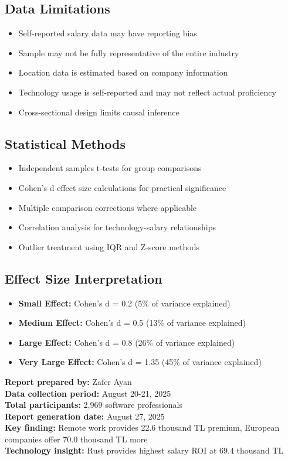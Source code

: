 \documentclass[12pt,a4paper]{article}
\begin{document}
\subsection{Data Limitations}
\begin{itemize}
    \item Self-reported salary data may have reporting bias
    \item Sample may not be fully representative of the entire industry
    \item Location data is estimated based on company information
    \item Technology usage is self-reported and may not reflect actual proficiency
    \item Cross-sectional design limits causal inference
\end{itemize}

\subsection{Statistical Methods}
\begin{itemize}
    \item Independent samples t-tests for group comparisons
    \item Cohen's d effect size calculations for practical significance
    \item Multiple comparison corrections where applicable
    \item Correlation analysis for technology-salary relationships
    \item Outlier treatment using IQR and Z-score methods
\end{itemize}

\subsection{Effect Size Interpretation}
\begin{itemize}
    \item \textbf{Small Effect:} Cohen's d = 0.2 (5\% of variance explained)
    \item \textbf{Medium Effect:} Cohen's d = 0.5 (13\% of variance explained)
    \item \textbf{Large Effect:} Cohen's d = 0.8 (26\% of variance explained)
    \item \textbf{Very Large Effect:} Cohen's d = 1.35 (45\% of variance explained)
\end{itemize}

\vspace{2cm}

\begin{center}
\textbf{Report prepared by:} Zafer Ayan\\
\textbf{Data collection period:} August 20-21, 2025\\
\textbf{Total participants:} 2,969 software professionals\\
\textbf{Report generation date:} August 27, 2025\\
\textbf{Key finding:} Remote work provides 22.6 thousand TL premium, European companies offer 70.0 thousand TL more\\
\textbf{Technology insight:} Rust provides highest salary ROI at 69.4 thousand TL
\end{center}
\end{document}
